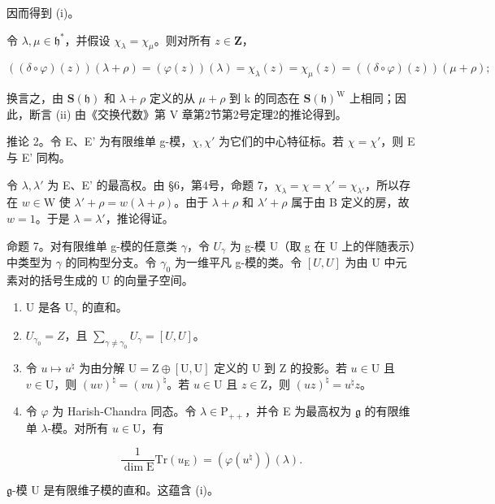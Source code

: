 因而得到 (i)。

令 \(\lambda, \mu \in \mathfrak{h}^*\)，并假设 \(\chi_{\lambda} = \chi_{\mu}\)。则对所有 \(z \in \mathbf{Z}\)，

\[
((\delta \circ \varphi) (z)) (\lambda + \rho) = (\varphi (z)) (\lambda) = \chi_ {\lambda} (z) = \chi_ {\mu} (z) = ((\delta \circ \varphi) (z)) (\mu + \rho);
\]

换言之，由 \(\mathbf{S}(\mathfrak{h})\) 和 \(\lambda + \rho\) 定义的从 \(\mu + \rho\) 到 k 的同态在 \(\mathbf{S}(\mathfrak{h})^{\mathrm{W}}\) 上相同；因此，断言 (ii) 由《交换代数》第 V 章第2节第2号定理2的推论得到。

推论 2。令 E、E' 为有限维单 g-模，\(\chi, \chi'\) 为它们的中心特征标。若 \(\chi = \chi'\)，则 E 与 E' 同构。

令 \(\lambda, \lambda'\) 为 E、E' 的最高权。由 §6，第4号，命题 7，\(\chi_{\lambda} = \chi = \chi' = \chi_{\lambda'}\)，所以存在 \(w \in \mathrm{W}\) 使 \(\lambda' + \rho = w(\lambda + \rho)\)。由于 \(\lambda + \rho\) 和 \(\lambda' + \rho\) 属于由 B 定义的房，故 \(w = 1\)。于是 \(\lambda = \lambda'\)，推论得证。

命题 7。对有限维单 g-模的任意类 \(\gamma\)，令 \(U_{\gamma}\) 为 g-模 U（取 g 在 U 上的伴随表示）中类型为 \(\gamma\) 的同构型分支。令 \(\gamma_{0}\) 为一维平凡 g-模的类。令 \([U,U]\) 为由 U 中元素对的括号生成的 U 的向量子空间。

\begin{enumerate}
\def\labelenumi{(\roman{enumi})}
\item
  U 是各 \(\mathrm{U}_{\gamma}\) 的直和。
\item
  \(U_{\gamma_{0}} = Z\)，且 \(\sum_{\gamma \neq \gamma_{0}} U_{\gamma} = [U, U]\)。
\item
  令 \(u \mapsto u^{\natural}\) 为由分解 \(\mathrm{U} = \mathrm{Z} \oplus [\mathrm{U}, \mathrm{U}]\) 定义的 U 到 Z 的投影。若 \(u \in \mathrm{U}\) 且 \(v \in \mathrm{U}\)，则 \((uv)^{\natural} = (vu)^{\natural}\)。若 \(u \in \mathrm{U}\) 且 \(z \in \mathrm{Z}\)，则 \((uz)^{\natural} = u^{\natural}z\)。
\item
  令 \(\varphi\) 为 Harish-Chandra 同态。令 \(\lambda \in \mathrm{P}_{++}\)，并令 E 为最高权为 \(\mathfrak{g}\) 的有限维单 \(\lambda\)-模。对所有 \(u \in \mathrm{U}\)，有
\end{enumerate}

\[
\frac {1}{\dim \mathrm{E}} \mathrm{Tr} (u _ {\mathrm{E}}) = (\varphi (u ^ {\natural})) (\lambda).
\]

 \(\mathfrak{g}\)-模 U 是有限维子模的直和。这蕴含 (i)。

